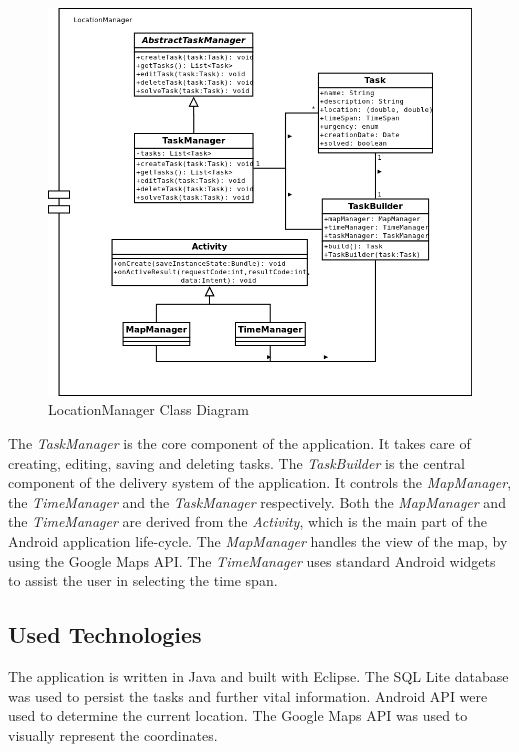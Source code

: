  \begin{figure}[h!]
  \caption{LocationManager Class Diagram}
  \center
  	\includegraphics[scale=0.5]{../resources/ClassDiagram.png}
\end{figure}
The \emph{TaskManager} is the core component of the application. It takes care
of creating, editing, saving and deleting tasks. The \emph{TaskBuilder} is the
central component of the delivery system of the application. It controls the
\emph{MapManager}, the \emph{TimeManager} and the \emph{TaskManager}
respectively. Both the \emph{MapManager} and the \emph{TimeManager} are derived
from the \emph{Activity}, which is the main part of the Android application
life-cycle. The \emph{MapManager} handles the view of the map, by using the
Google Maps API. The \emph{TimeManager} uses standard Android widgets to assist
the user in selecting the time span.
\newpage
\subsection{Used Technologies}
The application is written in Java and built with Eclipse. The SQL Lite database
was used to persist the tasks and further vital information. Android API were
used to determine the current location. The Google Maps API was used to visually
represent the coordinates.